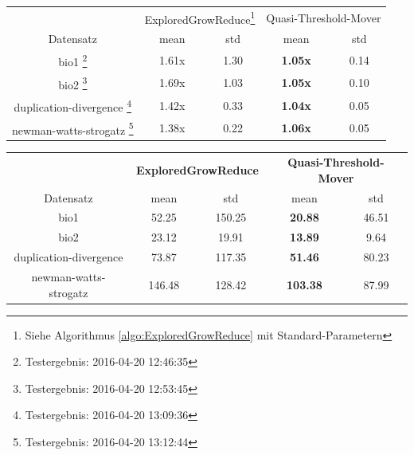 \documentclass[12pt,a4paper,onecolumn,oneside,titlepage]{article}
\begin{document}
\begin{center}
\label{tab:qual_mover}
\begin{tabular}{c|c c|c c}
& \multicolumn{2}{c|}{ExploredGrowReduce\footnote{Siehe Algorithmus \ref{algo:ExploredGrowReduce} mit Standard-Parametern }} & \multicolumn{2}{c}{Quasi-Threshold-Mover} \\ 
Datensatz & \multicolumn{1}{c}{mean}  &  \multicolumn{1}{c|}{std} &  \multicolumn{1}{c}{mean} &  \multicolumn{1}{c}{std} \\ 
\hline 
bio1 \footnote{Testergebnis: 2016-04-20 12:46:35 } & 1.61x  & 1.30 & \textbf{1.05x} & 0.14 \\ 

bio2 \footnote{Testergebnis: 2016-04-20 12:53:45} & 1.69x & 1.03 & \textbf{1.05x} & 0.10 \\ 

duplication-divergence \footnote{Testergebnis: 2016-04-20 13:09:36} & 1.42x & 0.33 & \textbf{1.04x} & 0.05 \\ 

newman-watts-strogatz \footnote{Testergebnis: 2016-04-20 13:12:44} & 1.38x & 0.22 & \textbf{1.06x} & 0.05 \\ 

\end{tabular} 
\end{center}

\begin{center}
\label{tab:size_mover}


\begin{tabular}{c|c c|c c}


 & \multicolumn{2}{c|}{\textbf{ExploredGrowReduce}} & \multicolumn{2}{c}{\textbf{Quasi-Threshold-Mover}} \\ 
Datensatz & \multicolumn{1}{c}{mean}  &  \multicolumn{1}{c|}{std} &  \multicolumn{1}{c}{mean} &  \multicolumn{1}{c}{std} \\ 
\hline 
bio1 & 52.25  & 150.25 & \textbf{20.88} & 46.51 \\ 

bio2 & 23.12 & 19.91 & \textbf{13.89} & 9.64 \\ 

duplication-divergence & 73.87 & 117.35 & \textbf{51.46} & 80.23 \\ 

newman-watts-strogatz & 146.48 & 128.42 & \textbf{103.38} & 87.99 \\ 

\end{tabular} 
\end{center}
\end{document}
